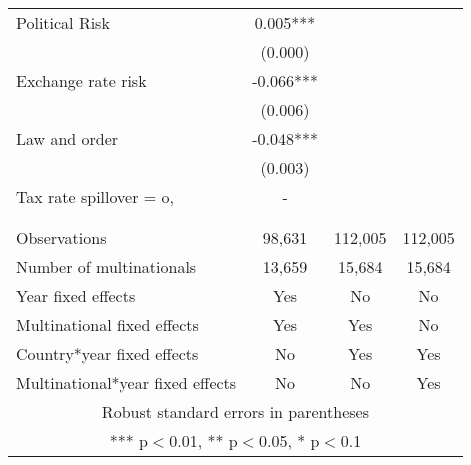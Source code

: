 \begin{tabular}{lccc}
Political Risk & 0.005*** &  &  \\
 & (0.000) &  &  \\
Exchange rate risk & -0.066*** &  &  \\
 & (0.006) &  &  \\
Law and order & -0.048*** &  &  \\
 & (0.003) &  &  \\
Tax rate spillover = o, & - &  &  \\
 &  &  &  \\
 &  &  &  \\
Observations & 98,631 & 112,005 & 112,005 \\
Number of multinationals & 13,659 & 15,684 & 15,684 \\
Year fixed effects & Yes & No & No \\
Multinational fixed effects & Yes & Yes & No \\
Country*year fixed effects & No & Yes & Yes \\
 Multinational*year fixed effects & No & No & Yes \\ \hline
\multicolumn{4}{c}{ Robust standard errors in parentheses} \\
\multicolumn{4}{c}{ *** p$<$0.01, ** p$<$0.05, * p$<$0.1} \\
\end{tabular}
